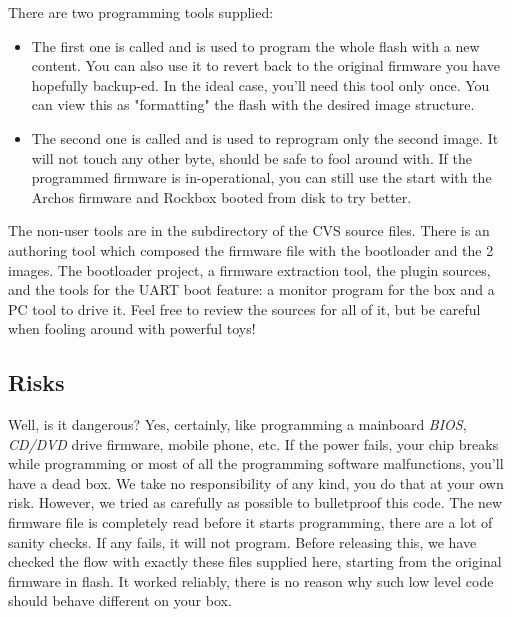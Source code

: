 
There are two programming tools supplied:

\begin{itemize}
\item The first one is called  and is used to 
  program the whole flash with a new content. You can also use it to revert 
  back to the original firmware you have hopefully backup-ed. In the ideal case, 
  you'll need this tool only once. You can view this as "formatting" the flash 
  with the desired image structure.
\item The second one is called  and is used to 
  reprogram only the second image. It will not touch any other byte, should be 
  safe to fool around with. If the programmed firmware is in-operational, you 
  can still use the  start with the Archos firmware and Rockbox booted
  from disk to try better.
\end{itemize}

The non-user tools are in the  subdirectory of the CVS source 
files. There is an authoring tool which composed the firmware file with the 
bootloader and the 2 images. The bootloader project, a firmware extraction 
tool, the plugin sources, and the tools for the UART boot feature: a monitor 
program for the box and a PC tool to drive it. Feel free to review the sources 
for all of it, but be careful when fooling around with powerful toys!

\subsection{Risks}
Well, is it dangerous? Yes, certainly, like programming a mainboard 
\emph{BIOS}, \emph{CD/DVD} drive firmware, mobile phone, etc. If the power 
fails, your chip breaks while programming or most of all the programming 
software malfunctions, you'll have a dead box. We take no responsibility of any
kind, you do that at your own risk. However, we tried as carefully as possible 
to bulletproof this code. The new firmware file is completely read before it 
starts programming, there are a lot of sanity checks. If any fails, it will not
program. Before releasing this, we have checked the flow with exactly these 
files supplied here, starting from the original firmware in flash. It worked 
reliably, there is no reason why such low level code should behave different on 
your box.

